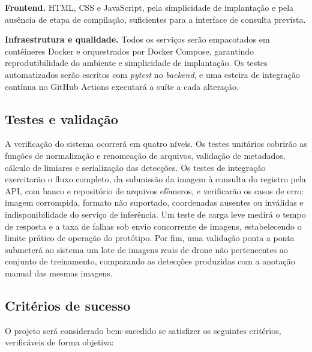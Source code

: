 \documentclass[12pt]{article}
\begin{document}
\textbf{Frontend.} HTML, CSS e JavaScript, pela simplicidade de
implantação e pela ausência de etapa de compilação, suficientes para a
interface de consulta prevista.

\textbf{Infraestrutura e qualidade.} Todos os serviços serão empacotados
em contêineres Docker e orquestrados por Docker Compose, garantindo
reprodutibilidade do ambiente e simplicidade de implantação. Os testes
automatizados serão escritos com \emph{pytest} no \emph{backend}, e uma
esteira de integração contínua no GitHub Actions executará a suíte a cada
alteração.

\subsection{Testes e validação}
\label{sec:testes}

A verificação do sistema ocorrerá em quatro níveis. Os testes unitários
cobrirão as funções de normalização e renomeação de arquivos, validação
de metadados, cálculo de limiares e serialização das detecções. Os testes
de integração exercitarão o fluxo completo, da submissão da imagem à
consulta do registro pela API, com banco e repositório de arquivos
efêmeros, e verificarão os casos de erro: imagem corrompida, formato não
suportado, coordenadas ausentes ou inválidas e indisponibilidade do
serviço de inferência. Um teste de carga leve medirá o tempo de resposta
e a taxa de falhas sob envio concorrente de imagens, estabelecendo o
limite prático de operação do protótipo. Por fim, uma validação ponta a
ponta submeterá ao sistema um lote de imagens reais de drone não
pertencentes ao conjunto de treinamento, comparando as detecções
produzidas com a anotação manual das mesmas imagens.

\subsection{Critérios de sucesso}
\label{sec:criterios}

O projeto será considerado bem-sucedido se satisfizer os seguintes
critérios, verificáveis de forma objetiva:
\end{document}
